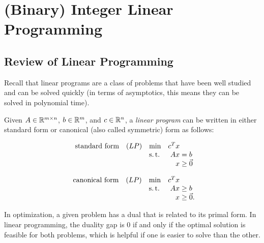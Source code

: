 \section{(Binary) Integer Linear Programming}

\subsection{Review of Linear Programming}
\label{subsec:review-of-linear-programming}

Recall that linear programs are a class of problems that have been well studied and can be solved quickly (in terms of asymptotics, this means they can be solved in polynomial time).

\begin{defn}
\label{defn:linear-program}
    Given $A \in \mathbb R^{m\times n}$, $b \in \mathbb R^m$, and $c \in \mathbb R^n$, a \textit{linear program} can be written in either standard form or canonical (also called symmetric) form as follows:
    \begin{multicols}{2}
        \noindent
        \begin{equation*}
        \begin{array}{lllr@{}l@{}l@{}}
        \text{standard form} 
            & (LP)  & \min  & c^T x &           \\
            &       & \st   & Ax    & {}= b     \\
            &       &       &  x    & {}\ge \Vec{0}
        \end{array}
        \end{equation*}
    
        \noindent
        \begin{equation*}
        \begin{array}{lllr@{}l@{}l@{}}
        \text{canonical form} 
            & (LP)  & \min  & c^T x &           \\
            &       & \st   & Ax    & {}\ge b   \\
            &       &       &  x    & {}\ge \Vec{0}.
        \end{array}
        \end{equation*}
    \end{multicols}
\end{defn}

In optimization, a given problem has a dual that is related to its primal form. In linear programming, the duality gap is 0 if and only if the optimal solution is feasible for both problems, which is helpful if one is easier to solve than the other.

